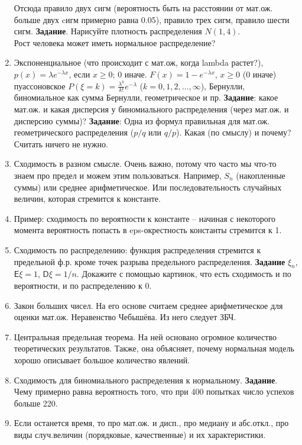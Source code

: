 \begin{enumerate}
Отсюда правило двух сигм (вероятность быть на расстоянии от мат.ож. больше двух cигм примерно равна 0.05), правило трех сигм, правило шести сигм.
\textbf{Задание}. Нарисуйте плотность распределения $N(1,4)$.\\
Рост человека может иметь нормальное распределение?
\item
Экспоненциальное (что происходит с мат.ож, когда lambda растет?), $p(x)=\lambda e^{-\lambda x}$, если $x\ge 0$; 0 иначе. $F(x) = 1-e^{-\lambda x}$, $x\ge 0$ (0 иначе)\\
пуассоновское $P(\xi = k) = \frac{\lambda^k}{k!} e^{-\lambda}$ ($k=0,1,2,\ldots,\infty$), Бернулли, биномиальное как сумма Бернулли, геометрическое и пр.
\textbf{Задание}: какое мат.ож. и какая дисперсия у биномиального распределения (через мат.ож. и дисперсию суммы)?
\textbf{Задание}: Одна из формул правильная для мат.ож. геометрического распределения ($p/q$ или $q/p$). Какая (по смыслу) и почему? Считать ничего не нужно.
\item	Сходимость в разном смысле. Очень важно, потому что часто мы что-то знаем про предел и можем этим пользоваться. Например, $S_n$ (накопленные суммы) или среднее арифметическое. Или последовательность случайных величин, которая стремится к константе.
\item	Пример: сходимость по вероятности к константе – начиная с некоторого момента вероятность попасть в eps-окрестность константы стремится к 1.
\item	Сходимость по распределению: функция распределения стремится к предельной ф.р. кроме точек разрыва предельного распределения.
\textbf{Задание} $\xi_n$, $\textsf{E} \xi = 1$, $\textsf{D}\xi = 1/n$. Докажите с помощью картинок, что есть сходимость и по вероятности, и по распределению к 0.
\item	Закон больших чисел. На его основе считаем среднее арифметическое для оценки мат.ож.  Неравенство Чебышёва. Из него следует ЗБЧ.
\item	Центральная предельная теорема. На ней основано огромное количество теоретических результатов. Также, она объясняет, почему нормальная модель хорошо описывает большое количество явлений.
\item	Сходимость для биномиального распределения к нормальному. \textbf{Задание}. Чему примерно равна вероятность того, что при 400 попытках число успехов больше 220.
\item	Если останется время, то про мат.ож. и дисп., про медиану и абс.откл., про виды случ.величин (порядковые, качественные) и их характеристики.
\end{enumerate}
